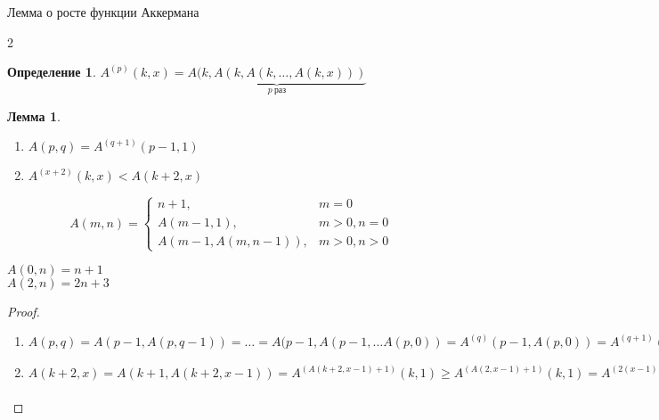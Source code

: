\documentclass[aspectratio=169]{beamer}
\newtheorem{dfn}{Определение}[section]
\newtheorem{lmm}{Лемма}[section]
\begin{document}
\begin{frame}{Лемма о росте функции Аккермана}
\begin{multicols}{2}
\begin{dfn}$A^{(p)}(k,x) = \underbrace{A(k,A(k,A(k,\dots,A(k,x)))}_{p\ \text{раз}}$\end{dfn}
\begin{lmm}
\begin{enumerate}
\item $A(p,q) = A^{(q+1)}(p-1,1)$
\item $A^{(x+2)}(k,x) < A(k+2,x)$
\end{enumerate}\end{lmm}
\columnbreak

\color{gray}\footnotesize
$$A(m,n) = \left\{\begin{array}{ll}
  n+1,&m = 0\\
  A(m-1,1),&m > 0, n = 0\\
  A(m-1,A(m,n-1)),&m > 0, n > 0
\end{array}\right.$$

$A(0,n) = n+1$ \\

$A(2,n) = 2n + 3$

\end{multicols}

\vspace{-0.5cm}
\begin{proof}
\begin{enumerate}
\item $A(p,q) = A(p-1,A(p,q-1)) = \dots = A(p-1,A(p-1,\dots A(p,0)) = A^{(q)}(p-1,A(p,0)) = A^{(q+1)}(p-1,1)$

\item

$A(k+2,x) = A(k+1,A(k+2,x-1)) = A^{(A(k+2,x-1)+1)}(k,1) \ge A^{(A(2,x-1)+1)}(k,1) = A^{(2(x-1)+3+1)}(k,1)
= A^{(2x+2)}(k,1) = A^{(x+2)}(k,A^{(x)}(k,1)) \ge A^{(x+2)}(k,A^{(x)}(0,1)) = A^{(x+2)}(k,x+1) > A^{(x+2)}(k,x)$

\end{enumerate}
\end{proof}
\end{frame}
\end{document}
